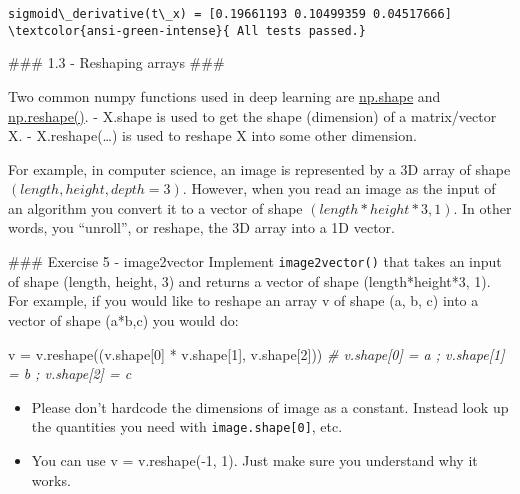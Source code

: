 \documentclass[11pt]{article}
\providecommand{\tightlist}{%
      \setlength{\itemsep}{0pt}\setlength{\parskip}{0pt}}
\newenvironment{Shaded}{}{}
\newcommand{\DecValTok}[1]{\textcolor[rgb]{0.25,0.63,0.44}{{#1}}}
\newcommand{\CommentTok}[1]{\textcolor[rgb]{0.38,0.63,0.69}{\textit{{#1}}}}
\newcommand{\NormalTok}[1]{{#1}}
\newcommand{\OperatorTok}[1]{\textcolor[rgb]{0.40,0.40,0.40}{{#1}}}
\begin{document}
    \begin{Verbatim}[commandchars=\\\{\}]
sigmoid\_derivative(t\_x) = [0.19661193 0.10499359 0.04517666]
\textcolor{ansi-green-intense}{ All tests passed.}
    \end{Verbatim}

    \#\#\# 1.3 - Reshaping arrays \#\#\#

Two common numpy functions used in deep learning are
\href{https://docs.scipy.org/doc/numpy/reference/generated/numpy.ndarray.shape.html}{np.shape}
and
\href{https://docs.scipy.org/doc/numpy/reference/generated/numpy.reshape.html}{np.reshape()}.
- X.shape is used to get the shape (dimension) of a matrix/vector X. -
X.reshape(\ldots) is used to reshape X into some other dimension.

For example, in computer science, an image is represented by a 3D array
of shape \((length, height, depth = 3)\). However, when you read an
image as the input of an algorithm you convert it to a vector of shape
\((length*height*3, 1)\). In other words, you ``unroll'', or reshape,
the 3D array into a 1D vector.

\#\#\# Exercise 5 - image2vector Implement \texttt{image2vector()} that
takes an input of shape (length, height, 3) and returns a vector of
shape (length*height*3, 1). For example, if you would like to reshape an
array v of shape (a, b, c) into a vector of shape (a*b,c) you would do:

\begin{Shaded}
\begin{Highlighting}[]
\NormalTok{v }\OperatorTok{=}\NormalTok{ v.reshape((v.shape[}\DecValTok{0}\NormalTok{] }\OperatorTok{*}\NormalTok{ v.shape[}\DecValTok{1}\NormalTok{], v.shape[}\DecValTok{2}\NormalTok{])) }\CommentTok{\# v.shape[0] = a ; v.shape[1] = b ; v.shape[2] = c}
\end{Highlighting}
\end{Shaded}

\begin{itemize}
\tightlist
\item
  Please don't hardcode the dimensions of image as a constant. Instead
  look up the quantities you need with \texttt{image.shape{[}0{]}}, etc.
\item
  You can use v = v.reshape(-1, 1). Just make sure you understand why it
  works.
\end{itemize}
\end{document}
